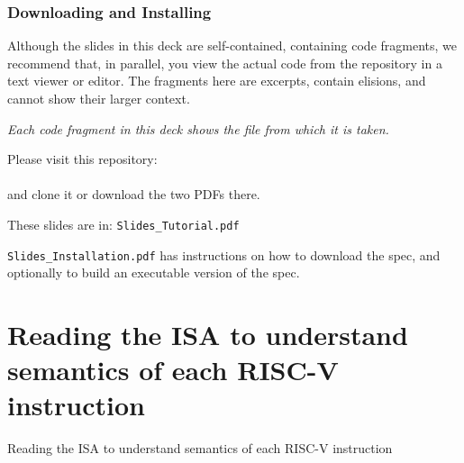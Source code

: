 \documentclass[aspectratio=169]{beamer}
\newcommand{\hmm}{\hspace*{2em}}
\newcommand{\slidefont}{\scriptsize}
\begin{document}

\begin{frame}[fragile]
  \frametitle{Downloading and Installing}

  Although the slides in this deck are self-contained, containing code
  fragments, we recommend that, in parallel, you view the actual code
  from the repository in a text viewer or editor.  The fragments here
  are excerpts, contain elisions, and cannot show their larger
  context.

  \vspace{1ex}

  \emph{Each code fragment in this deck shows the file from which it is taken.}

  \vspace{1ex}

  \begin{block}{}
    Please visit this repository: \\
    \hmm {\tt https://github.com/rsnikhil/RISCV\_ISA\_Spec\_Tour} \\
    and clone it or download the two PDFs there.

    \vspace{1ex}

    These slides are in:  {\tt Slides\_Tutorial.pdf}

    \vspace{1ex}

    {\tt Slides\_Installation.pdf} has instructions on how to download
    the spec, and optionally to build an executable version of the
    spec.
  \end{block}

\end{frame}



\section{Reading the ISA to understand semantics of each RISC-V instruction}


\begin{frame}[fragile]

  \slidefont

  \vfill

  \begin{center}\LARGE
    Reading the ISA to understand semantics of each RISC-V instruction
  \end{center}

  \vfill

\end{frame}
\end{document}
